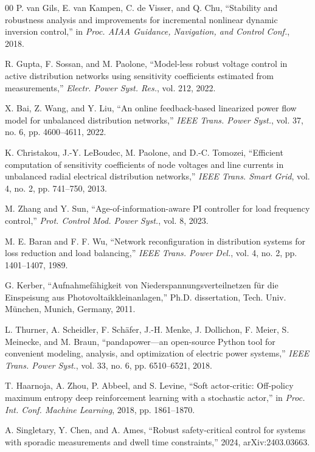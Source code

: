 \documentclass[conference,a4paper]{IEEEtran}
\begin{document}
\begin{thebibliography}{00}
 P. van Gils, E. van Kampen, C. de Visser, and Q. Chu, ``Stability
and robustness analysis and improvements for incremental nonlinear dynamic
inversion control,'' in \emph{Proc. AIAA Guidance, Navigation, and Control
Conf.}, 2018.

 R. Gupta, F. Sossan, and M. Paolone, ``Model-less robust
voltage control in active distribution networks using sensitivity coefficients
estimated from measurements,'' \emph{Electr. Power Syst. Res.}, vol. 212, 2022.

 X. Bai, Z. Wang, and Y. Liu, ``An online feedback-based
linearized power flow model for unbalanced distribution networks,'' \emph{IEEE
Trans. Power Syst.}, vol. 37, no. 6, pp. 4600--4611, 2022.

 K. Christakou, J.-Y. LeBoudec, M. Paolone, and
D.-C. Tomozei, ``Efficient computation of sensitivity coefficients of node
voltages and line currents in unbalanced radial electrical distribution
networks,'' \emph{IEEE Trans. Smart Grid}, vol. 4, no. 2, pp. 741--750, 2013.

 M. Zhang and Y. Sun, ``Age-of-information-aware PI controller
for load frequency control,'' \emph{Prot. Control Mod. Power Syst.}, vol. 8,
2023.

 M. E. Baran and F. F. Wu, ``Network reconfiguration in
distribution systems for loss reduction and load balancing,'' \emph{IEEE Trans.
Power Del.}, vol. 4, no. 2, pp. 1401--1407, 1989.

 G. Kerber, ``Aufnahmef\"ahigkeit von
Niederspannungsverteilnetzen f\"ur die Einspeisung aus Photovoltaikkleinanlagen,''
Ph.D. dissertation, Tech. Univ. M\"unchen, Munich, Germany, 2011.

 L. Thurner, A. Scheidler, F. Sch\"afer, J.-H. Menke,
J. Dollichon, F. Meier, S. Meinecke, and M. Braun, ``pandapower---an open-source
Python tool for convenient modeling, analysis, and optimization of electric power
systems,'' \emph{IEEE Trans. Power Syst.}, vol. 33, no. 6, pp. 6510--6521, 2018.

 T. Haarnoja, A. Zhou, P. Abbeel, and S. Levine, ``Soft
actor-critic: Off-policy maximum entropy deep reinforcement learning with a
stochastic actor,'' in \emph{Proc. Int. Conf. Machine Learning}, 2018,
pp. 1861--1870.

 A. Singletary, Y. Chen, and A. Ames, ``Robust
safety-critical control for systems with sporadic measurements and dwell time
constraints,'' 2024, arXiv:2403.03663.

\end{thebibliography}
\end{document}
